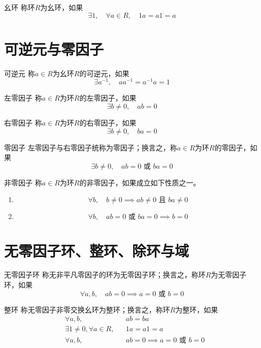 \documentclass[lang = cn, scheme = chinese, thmcnt = section]{elegantbook}
\begin{document}
\begin{definition}{幺环}
	称环$R$为幺环，如果
	$$
	\exists 1,\quad \forall a\in R,\quad 1a=a1=a
	$$
\end{definition}

\section{可逆元与零因子}

\begin{definition}{可逆元}
	称$a\in R$为幺环$R$的可逆元，如果
	$$
	\exists a^{-1},\quad aa^{-1}=a^{-1}a=1
	$$
\end{definition}

\begin{definition}{左零因子}
	称$a\in R$为环$R$的左零因子，如果
	$$
	\exists b\ne0,\quad ab=0
	$$
\end{definition}

\begin{definition}{右零因子}
	称$a\in R$为环$R$的右零因子，如果
	$$
	\exists b\ne0,\quad ba=0
	$$
\end{definition}

\begin{definition}{零因子}
	左零因子与右零因子统称为零因子；换言之，称$a\in R$为环$R$的零因子，如果
	$$
	\exists b\ne0,\quad ab=0\text{ 或 }ba=0
	$$
\end{definition}

\begin{definition}{非零因子}
	称$a\in R$为环$R$的非零因子，如果成立如下性质之一。
	\begin{enumerate}
		\item $$
		\forall b,\quad b\ne0\implies ab\ne0\text{ 且 }ba\ne0
		$$
		\item $$
		\forall b,\quad ab=0\text{ 或 }ba=0\implies b=0
		$$
	\end{enumerate}
\end{definition}

\section{无零因子环、整环、除环与域}

\begin{definition}{无零因子环}
	称无非平凡零因子的环为无零因子环；换言之，称环$R$为无零因子环，如果
	$$
	\forall a,b,\quad ab=0\implies a=0\text{ 或 }b=0
	$$
\end{definition}

\begin{definition}{整环}
	称无零因子非零交换幺环为整环；换言之，称环$R$​为整环，如果
	\begin{align*}
		&\forall a,b,&&ab=ba\\
		&\exists 1\ne 0,\forall a\in R,&&1a=a1=a\\
		&\forall a,b,&&ab=0\implies a=0\text{ 或 }b=0
	\end{align*}
\end{definition}
\end{document}
